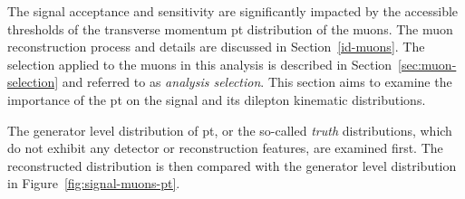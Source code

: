 The signal acceptance and sensitivity are significantly impacted by the accessible thresholds of the transverse momentum \gls{pt} distribution of the muons. The muon reconstruction process and details are discussed in Section~\ref{id-muons}. The selection applied to the muons in this analysis is described in Section~\ref{sec:muon-selection} and referred to as \emph{analysis selection}. This section aims to examine the importance of the \gls{pt} on the signal and its dilepton kinematic distributions.

The generator level distribution of \gls{pt}, or the so-called \emph{truth} distributions, which do not exhibit any detector or reconstruction features, are examined first. The reconstructed distribution is then compared with the generator level distribution in Figure~\ref{fig:signal-muons-pt}. 

